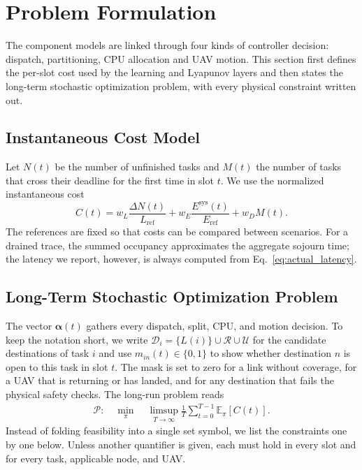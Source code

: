 \section{Problem Formulation}
\label{problem_formulation}

The component models are linked through four kinds of controller decision:
dispatch, partitioning, CPU allocation and UAV motion. This section first
defines the per-slot cost used by the learning and Lyapunov layers and then
states the long-term stochastic optimization problem, with every physical
constraint written out.

\subsection{Instantaneous Cost Model}
Let $N(t)$ be the number of unfinished tasks and $M(t)$ the number of tasks
that cross their deadline for the first time in slot $t$. We use the
normalized instantaneous cost
\begin{equation}
C(t)=w_L\frac{\Delta N(t)}{L_{\mathrm{ref}}}
+w_E\frac{E^{\mathrm{sys}}(t)}{E_{\mathrm{ref}}}
+w_DM(t).
\label{eq:cost}
\end{equation}
The references are fixed so that costs can be compared between scenarios.
For a drained trace, the summed occupancy approximates the aggregate sojourn
time; the latency we report, however, is always computed from
Eq.~\eqref{eq:actual_latency}.

\subsection{Long-Term Stochastic Optimization Problem}
The vector $\boldsymbol\alpha(t)$ gathers every dispatch, split, CPU, and
motion decision. To keep the notation short, we write
$\mathcal D_i=\{L(i)\}\cup\mathcal R\cup\mathcal U$ for the candidate
destinations of task $i$ and use $m_{in}(t)\in\{0,1\}$ to show whether
destination $n$ is open to this task in slot $t$. The mask is set to zero for
a link without coverage, for a UAV that is returning or has landed, and for
any destination that fails the physical safety checks. The long-run problem
reads
\begin{equation}
\begin{aligned}
\mathcal P:\quad \min_{\pi}\;&
\limsup_{T\to\infty}\frac1T
\sum_{t=0}^{T-1}\mathbb E_{\pi}[C(t)].
\end{aligned}
\label{eq:problem}
\end{equation}
Instead of folding feasibility into a single set symbol, we list the
constraints one by one below. Unless another quantifier is given, each must
hold in every slot and for every task, applicable node, and UAV.

